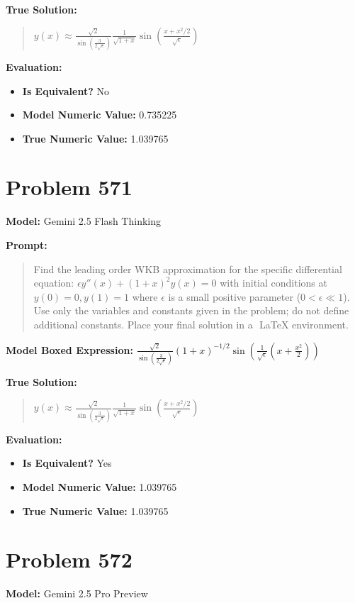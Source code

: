 \documentclass{article}
\begin{document}
\textbf{True Solution:}
\begin{quote}
$y(x) \approx \frac{\sqrt{2}}{\sin\left(\frac{3}{2\sqrt{\epsilon}}\right)} \frac{1}{\sqrt{1+x}} \sin\left(\frac{x + x^2/2}{\sqrt{\epsilon}}\right)$
\end{quote}

\textbf{Evaluation:}
\begin{itemize}
\item \textbf{Is Equivalent?} No
\item \textbf{Model Numeric Value:} 0.735225
\item \textbf{True Numeric Value:} 1.039765
\end{itemize}
\vspace{1cm}
\section*{Problem 571}
\textbf{Model:} Gemini 2.5 Flash Thinking

\textbf{Prompt:}
\begin{quote}
Find the leading order WKB approximation for the specific differential equation: $\epsilon y''(x) + (1+x)^2 y(x) = 0$ with initial conditions at $ y(0) = 0, y(1) = 1$ where $\epsilon$ is a small positive parameter ($0 < \epsilon \ll 1$). Use only the variables and constants given in the problem; do not define additional constants. Place your final solution in a $\boxed{}$ LaTeX environment.
\end{quote}
\textbf{Model Boxed Expression:} $\frac{\sqrt{2}}{\sin\left(\frac{3}{2\sqrt{\epsilon}}\right)} (1+x)^{-1/2} \sin\left(\frac{1}{\sqrt{\epsilon}}\left(x + \frac{x^2}{2}\right)\right)$

\textbf{True Solution:}
\begin{quote}
$y(x) \approx \frac{\sqrt{2}}{\sin\left(\frac{3}{2\sqrt{\epsilon}}\right)} \frac{1}{\sqrt{1+x}} \sin\left(\frac{x + x^2/2}{\sqrt{\epsilon}}\right)$
\end{quote}

\textbf{Evaluation:}
\begin{itemize}
\item \textbf{Is Equivalent?} Yes
\item \textbf{Model Numeric Value:} 1.039765
\item \textbf{True Numeric Value:} 1.039765
\end{itemize}
\vspace{1cm}
\section*{Problem 572}
\textbf{Model:} Gemini 2.5 Pro Preview
\end{document}
